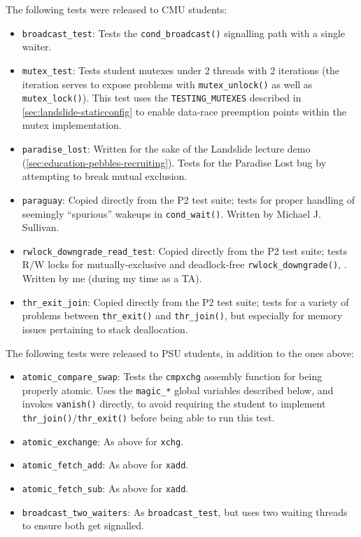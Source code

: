 
The following tests were released to CMU students:
\begin{itemize}
	\item {\tt broadcast\_test}:
		Tests the {\tt cond\_broadcast()} signalling path with a single waiter.
	\item {\tt mutex\_test}:
		Tests student mutexes under 2 threads with 2 iterations
		(the  iteration serves to expose problems with {\tt mutex\_unlock()} as well as {\tt mutex\_lock()}).
		This test uses the {\tt TESTING\_MUTEXES}
		described in \cref{sec:landslide-staticconfig}
		to enable data-race preemption points within the mutex implementation.
	\item {\tt paradise\_lost}:
		Written for the sake of the Landslide lecture demo
		(\cref{sec:education-pebbles-recruiting}).
		Tests for the Paradise Lost bug by attempting to break mutual exclusion.
	\item {\tt paraguay}:
		Copied directly from the P2 test suite;
		tests for proper handling of seemingly ``spurious'' wakeups in {\tt cond\_wait()}.
		Written by Michael J. Sullivan.
	\item {\tt rwlock\_downgrade\_read\_test}:
		Copied directly from the P2 test suite;
		tests R/W locks for mutually-exclusive and deadlock-free {\tt rwlock\_downgrade()},
		.
		Written by me (during my time as a TA).
	\item {\tt thr\_exit\_join}:
		Copied directly from the P2 test suite;
		tests for a variety of problems between {\tt thr\_exit()} and {\tt thr\_join()},
		but especially for memory issues pertaining to stack deallocation.
\end{itemize}
\vspace{1em}

\noindent The following tests were released to PSU students, in addition to the ones above:
\begin{itemize}
	\item {\tt atomic\_compare\_swap}:
		Tests the {\tt cmpxchg} assembly function for being properly atomic.
		Uses the {\tt magic\_*} global variables described below, and invokes {\tt vanish()} directly,
		to avoid requiring the student to implement {\tt thr\_join()}/{\tt thr\_exit()}
		before being able to run this test.
	\item {\tt atomic\_exchange}:
		As above for {\tt xchg}.
	\item {\tt atomic\_fetch\_add}:
		As above for {\tt xadd}.
	\item {\tt atomic\_fetch\_sub}:
		As above for {\tt xadd}.
	\item {\tt broadcast\_two\_waiters}:
		As {\tt broadcast\_test}, but uses two waiting threads to ensure both get signalled.
\end{itemize}
\vspace{1em}

